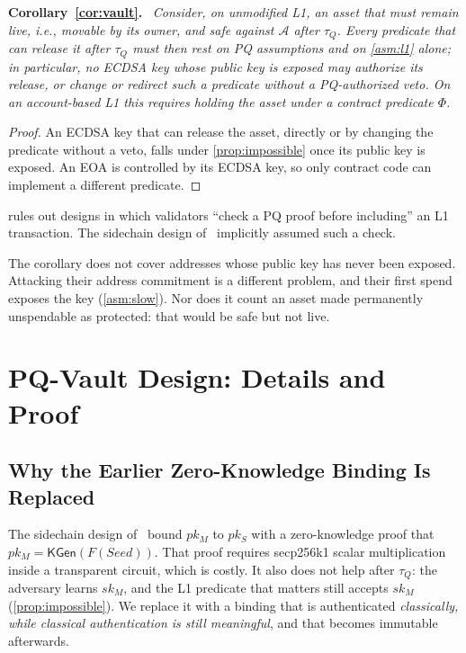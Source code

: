 \documentclass[10pt,journal,compsoc]{IEEEtran}
\theoremstyle{tplain}
\theoremstyle{tdef}
\theoremstyle{remark}
\newenvironment{restate}[1]{\par\smallskip\noindent\textbf{#1.}\ \itshape\ignorespaces}{\par\smallskip}
\begin{document}
\begin{restate}{Corollary~\ref{cor:vault}}
Consider, on unmodified L1, an asset that must remain \emph{live}, i.e., movable by its owner, and \emph{safe} against $\mathcal{A}$ after $\tau_Q$. Every predicate that can release it after $\tau_Q$ must then rest on PQ assumptions and on \cref{asm:l1} alone; in particular, no ECDSA key whose public key is exposed may authorize its release, or change or redirect such a predicate without a PQ-authorized veto. On an account-based L1 this requires holding the asset under a contract predicate $\Phi$.
\end{restate}
\begin{proof}
An ECDSA key that can release the asset, directly or by changing the predicate without a veto, falls under \cref{prop:impossible} once its public key is exposed. An EOA is controlled by its ECDSA key, so only contract code can implement a different predicate.
\end{proof}

\noindent {} rules out designs in which validators ``check a PQ proof before including'' an L1 transaction. The sidechain design of~\cite{myeprint} implicitly assumed such a check.

\noindent The corollary does not cover addresses whose public key has never been exposed. Attacking their address commitment is a different problem, and their first spend exposes the key (\cref{asm:slow}). Nor does it count an asset made permanently unspendable as protected: that would be safe but not live.
\section{PQ-Vault Design: Details and Proof}\label{S-design}

\subsection{Why the Earlier Zero-Knowledge Binding Is Replaced}
The sidechain design of~\cite{myeprint} bound $pk_M$ to $pk_S$ with a zero-knowledge proof that $pk_M=\mathsf{KGen}(F(\mathit{Seed}))$. That proof requires secp256k1 scalar multiplication inside a transparent circuit, which is costly. It also does not help after $\tau_Q$: the adversary learns $sk_M$, and the L1 predicate that matters still accepts $sk_M$ (\cref{prop:impossible}). We replace it with a binding that is authenticated \emph{classically, while classical authentication is still meaningful}, and that becomes immutable afterwards.
\end{document}
